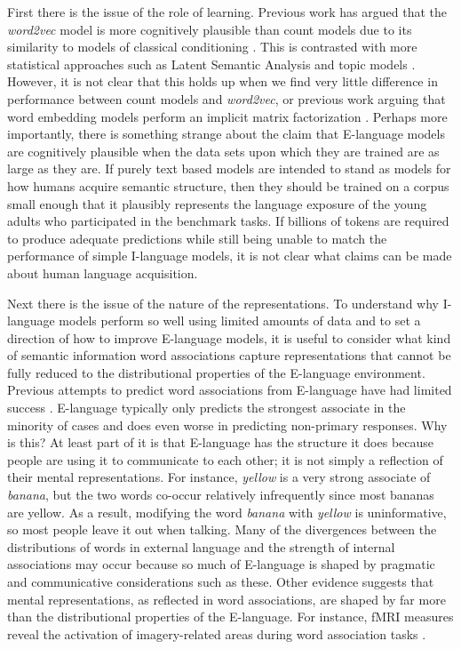 \documentclass{article}
\begin{document}
First there is the issue of the role of learning. Previous work has argued that the {\it word2vec} model is more cognitively plausible than count models due to its similarity to models of classical conditioning  \cite{Mandera2016Semantic}. This is contrasted with more statistical approaches such as Latent Semantic Analysis \cite{Landauer1997} and topic models \cite{Griffiths2007topics}. However, it is not clear that this holds up when we find very little difference in performance between count models and {\it word2vec}, or previous work arguing that word embedding models perform an implicit matrix factorization \cite{LevyGoldberg2014matrix}.
Perhaps more importantly, there is something strange about the claim that E-language models are cognitively plausible when the data sets upon which they are trained are as large as they are. If purely text based models are intended to stand as models for how humans acquire semantic structure, then they should be trained on a corpus small enough that it plausibly represents the language exposure of the young adults who participated in the benchmark tasks. If billions of tokens are required to produce adequate predictions while still being unable to match the performance of simple I-language models, it is not clear what claims can be made about human language acquisition.


Next there is the issue of the nature of the representations. To understand why I-language models perform so well using limited amounts of data and to set a direction of how to improve E-language models, it is useful to consider what kind of semantic information word associations capture representations that cannot be fully reduced to the distributional properties of the E-language environment. Previous attempts to predict word associations from E-language have had limited success \cite{Griffiths2007topics}. E-language typically only predicts the strongest associate in the minority of cases and does even worse in predicting non-primary responses. Why is this? At least part of it is that E-language has the structure it does because people are using it to communicate to each other; it is not simply a reflection of their mental representations. For instance, {\it yellow} is a very strong associate of {\it banana}, but the two words co-occur relatively infrequently since most bananas are yellow. As a result, modifying the word {\it banana} with {\it yellow} is uninformative, so most people leave it out when talking. Many of the divergences between the distributions of words in external language and the strength of internal associations may occur because so much of E-language is shaped by pragmatic and communicative considerations such as these. Other evidence suggests that mental representations, as reflected in word associations, are shaped by far more than the distributional properties of the E-language. For instance, fMRI measures reveal the activation of imagery-related areas during word association tasks \cite{Simmons2008}.
\end{document}

